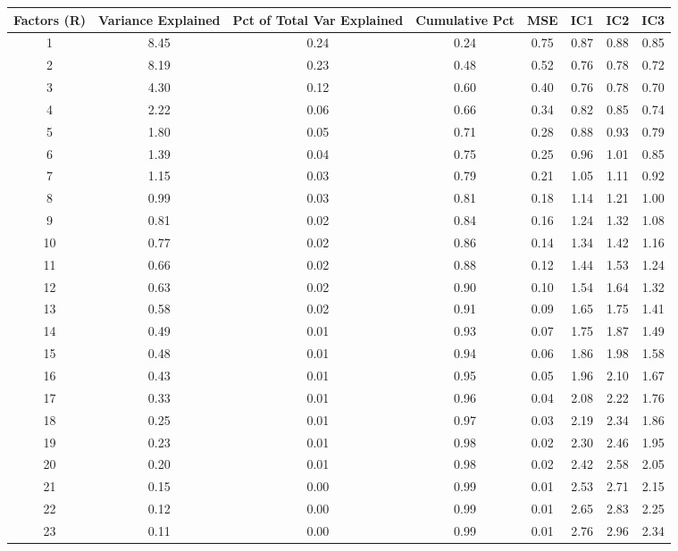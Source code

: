\documentclass[11pt, letterpaper]{article}\usepackage[]{graphicx}\usepackage[]{color}
\begin{document}
\begin{table}[H]
\centering
\begingroup\scriptsize
\begin{tabular}{cccccccc}
  \hline
Factors (R) & Variance Explained & Pct of Total Var Explained & Cumulative Pct & MSE & IC1 & IC2 & IC3 \\ 
  \hline
  1 & 8.45 & 0.24 & 0.24 & 0.75 & 0.87 & 0.88 & 0.85 \\ 
    2 & 8.19 & 0.23 & 0.48 & 0.52 & 0.76 & 0.78 & 0.72 \\ 
    3 & 4.30 & 0.12 & 0.60 & 0.40 & 0.76 & 0.78 & 0.70 \\ 
    4 & 2.22 & 0.06 & 0.66 & 0.34 & 0.82 & 0.85 & 0.74 \\ 
    5 & 1.80 & 0.05 & 0.71 & 0.28 & 0.88 & 0.93 & 0.79 \\ 
    6 & 1.39 & 0.04 & 0.75 & 0.25 & 0.96 & 1.01 & 0.85 \\ 
    7 & 1.15 & 0.03 & 0.79 & 0.21 & 1.05 & 1.11 & 0.92 \\ 
    8 & 0.99 & 0.03 & 0.81 & 0.18 & 1.14 & 1.21 & 1.00 \\ 
    9 & 0.81 & 0.02 & 0.84 & 0.16 & 1.24 & 1.32 & 1.08 \\ 
   10 & 0.77 & 0.02 & 0.86 & 0.14 & 1.34 & 1.42 & 1.16 \\ 
   11 & 0.66 & 0.02 & 0.88 & 0.12 & 1.44 & 1.53 & 1.24 \\ 
   12 & 0.63 & 0.02 & 0.90 & 0.10 & 1.54 & 1.64 & 1.32 \\ 
   13 & 0.58 & 0.02 & 0.91 & 0.09 & 1.65 & 1.75 & 1.41 \\ 
   14 & 0.49 & 0.01 & 0.93 & 0.07 & 1.75 & 1.87 & 1.49 \\ 
   15 & 0.48 & 0.01 & 0.94 & 0.06 & 1.86 & 1.98 & 1.58 \\ 
   16 & 0.43 & 0.01 & 0.95 & 0.05 & 1.96 & 2.10 & 1.67 \\ 
   17 & 0.33 & 0.01 & 0.96 & 0.04 & 2.08 & 2.22 & 1.76 \\ 
   18 & 0.25 & 0.01 & 0.97 & 0.03 & 2.19 & 2.34 & 1.86 \\ 
   19 & 0.23 & 0.01 & 0.98 & 0.02 & 2.30 & 2.46 & 1.95 \\ 
   20 & 0.20 & 0.01 & 0.98 & 0.02 & 2.42 & 2.58 & 2.05 \\ 
   21 & 0.15 & 0.00 & 0.99 & 0.01 & 2.53 & 2.71 & 2.15 \\ 
   22 & 0.12 & 0.00 & 0.99 & 0.01 & 2.65 & 2.83 & 2.25 \\ 
   23 & 0.11 & 0.00 & 0.99 & 0.01 & 2.76 & 2.96 & 2.34 \\ 

\end{tabular}
\end{table}
\end{document}
